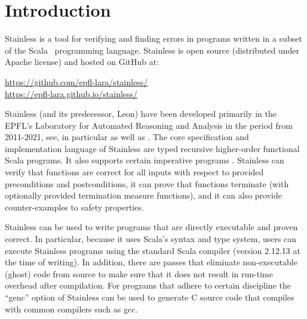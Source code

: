 \section{Introduction}

Stainless \cite{HamzaETAL19SystemFR} 
is a tool for verifying and finding errors in
programs written in a subset of the Scala~\cite{OderskyETAL20ProgrammingScala} programming language.
Stainless is open source (distributed under Apache license) and hosted on GitHub at:
\begin{center}
  \url{https://github.com/epfl-lara/stainless/} \\
  \url{https://epfl-lara.github.io/stainless/}
\end{center}
Stainless (and its predecessor, Leon) have
been developed primarily in the EPFL's Laboratory for
Automated Reasoning and Analysis in the period from
  2011-2021, see, in particular \cite{HamzaETAL19SystemFR, voirol2019} as well as
  \cite{schmid2021proving,MadhavanKuncak17Memoization,blanc2017,
    VoirolETAL15CounterExampleCompleteVerificationHigherOrderFunctions,
    BlancKuncak15SoundReasoningIntegralDataTypes, Kuncak15DevelopingVerifiedSoftwareUsingLeonNFM,
    KoukoutosKuncak14CheckingDataStructurePropertiesOrdersMagnitudeFaster,
    BlancETAL13VerificationTranslationRecursiveFunctions, KoeksalETAL12ConstraintsControl,
    SuterETAL11SatisfiabilityModuloRecursivePrograms,SuterETAL10DecisionProceduresforAlgebraicDataTypesAbstractions}.
The core specification and implementation
language of Stainless are typed recursive higher-order
functional Scala programs. It also supports certain
imperative programs \cite{schmid2021proving,blanc2017}. Stainless can verify that functions
are correct for all inputs with respect to provided
preconditions and postconditions, it can prove that
functions terminate (with optionally provided termination
measure functions), and it can also provide
counter-examples to safety properties.

Stainless can be used to write programs that are directly
executable and proven correct. In particular, because it
uses Scala's syntax and type system, users can execute
Stainless programs using the standard Scala compiler
(version 2.12.13 at the time of writing). In addition, there are passes
that eliminate non-executable (ghost) code from source to make sure
that it does not result in run-time overhead after compilation. For
programs that adhere to certain discipline the ``genc'' option of Stainless can
be used to generate C source code that compiles with common
compilers such as gcc.

